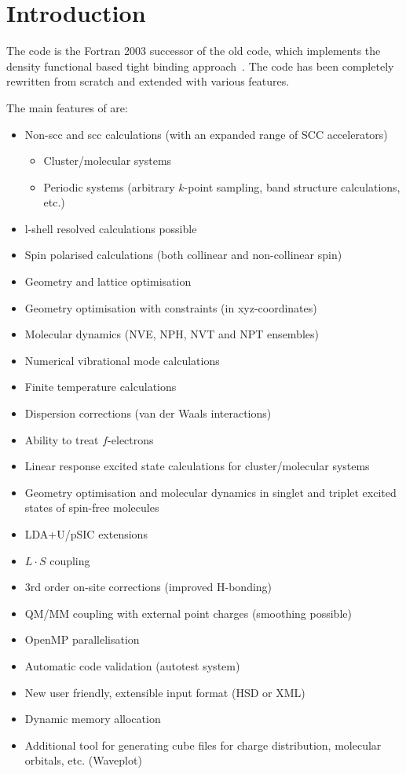 \chapter{Introduction}

The code {\dftbp} is the Fortran 2003 successor of the old {\dftb} code, which
implements the density functional based tight binding
approach~\cite{frauenheim-JPCM-14-3015}. The code has been completely rewritten
from scratch and extended with various features.

The main features of {\dftbp} are:
\begin{itemize}
\item Non-scc and scc calculations (with an expanded range of SCC
  accelerators)
  \begin{itemize}
  \item Cluster/molecular systems
  \item Periodic systems (arbitrary $k$-point sampling, band structure
    calculations, etc.)
  \end{itemize}
\item l-shell resolved calculations possible
\item Spin polarised calculations (both collinear and non-collinear
  spin)
\item Geometry and lattice optimisation
\item Geometry optimisation with constraints (in xyz-coordinates)
\item Molecular dynamics (NVE, NPH, NVT and NPT ensembles)
\item Numerical vibrational mode calculations
\item Finite temperature calculations
\item Dispersion corrections (van der Waals interactions)
\item Ability to treat $f$-electrons
\item Linear response excited state calculations for cluster/molecular systems
\item Geometry optimisation and molecular dynamics in singlet and triplet
  excited states of spin-free molecules
\item LDA+U/pSIC extensions
\item $L \cdot S$ coupling
\item 3rd order on-site corrections (improved H-bonding)
\item QM/MM coupling with external point charges (smoothing possible)
\item OpenMP parallelisation
\item Automatic code validation (autotest system)
\item New user friendly, extensible input format (HSD or XML)
\item Dynamic memory allocation
\item Additional tool for generating cube files for charge
  distribution, molecular orbitals, etc. (Waveplot)
\end{itemize}

